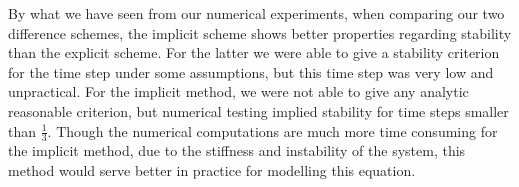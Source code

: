By what we have seen from our numerical experiments, when comparing our two difference schemes, the implicit scheme shows better properties regarding stability than the explicit scheme. For the latter we were able to give a stability criterion for the time step under some assumptions, but this time step was very low and unpractical. For the implicit method, we were not able to give any analytic reasonable criterion, but numerical testing implied stability for time steps smaller than $\frac{1}{3}$. Though the numerical computations are much more time consuming for the implicit method, due to the stiffness and instability of the system, this method would serve better in practice for modelling this equation.